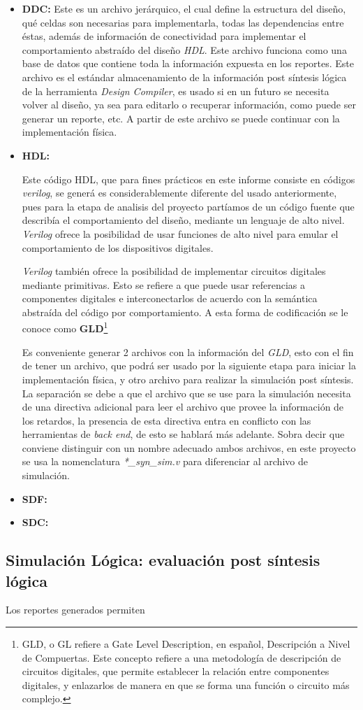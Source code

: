 \begin{itemize}
\item \textbf{DDC:} {Este es un archivo jerárquico, el cual define la estructura del diseño, qué celdas son necesarias para implementarla, todas las dependencias entre éstas, además de información de conectividad para implementar el comportamiento abstraído del diseño \textit{HDL}. Este archivo funciona como una base de datos que contiene toda la información expuesta en los reportes. Este archivo es el estándar almacenamiento de la información post síntesis lógica de la herramienta \textit{Design Compiler}, es usado si en un futuro se necesita volver al diseño, ya sea para editarlo o recuperar información, como puede ser generar un reporte, etc. A partir de este archivo se puede continuar con la implementación física.}

\item \textbf{HDL:} {Este código HDL, que para fines prácticos en este informe consiste en códigos \textit{verilog}, se generá es considerablemente diferente del usado anteriormente, pues para la etapa de analisis del proyecto partíamos de un código fuente que describía el comportamiento del diseño, mediante un lenguaje de alto nivel. \textit{Verilog} ofrece la posibilidad de usar funciones de alto nivel para emular el comportamiento de los dispositivos digitales.

\textit{Verilog} también ofrece la posibilidad de implementar circuitos digitales mediante primitivas. Esto se refiere a que puede usar referencias a componentes digitales e interconectarlos de acuerdo con la semántica abstraída del código por comportamiento. A esta forma de codificación se le conoce como \textbf{GLD}\footnote{GLD, o GL refiere a Gate Level Description, en español, Descripción a Nivel de Compuertas. Este concepto refiere a una metodología de descripción de circuitos digitales, que permite establecer la relación entre componentes digitales, y enlazarlos de manera en que se forma una función o circuito más complejo.}

Es conveniente generar 2 archivos con la información del \textit{GLD}, esto con el fin de tener un archivo, que podrá ser usado por la siguiente etapa para iniciar la implementación física, y otro archivo para realizar la simulación post síntesis. La separación se debe a que el archivo que se use para la simulación necesita de una directiva adicional para leer el archivo que provee la información de los retardos, la presencia de esta directiva entra en conflicto con las herramientas de \textit{back end}, de esto se hablará más adelante. Sobra decir que conviene distinguir con un nombre adecuado ambos archivos, en este proyecto se usa la nomenclatura \textit{*\_syn\_sim.v} para diferenciar al archivo de simulación.}

\item \textbf{SDF:} {}

\item \textbf{SDC:} {}

\end{itemize}

\subsection{Simulación Lógica: evaluación post síntesis lógica}

Los reportes generados permiten 
